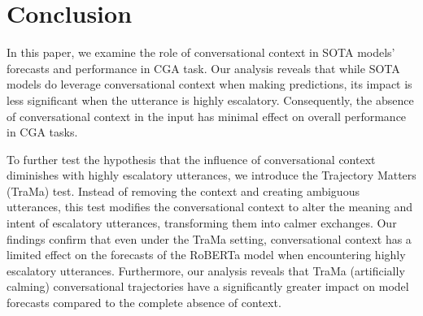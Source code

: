 \section{Conclusion}
In this paper, we examine the role of conversational context in SOTA models' forecasts and performance in CGA task. 
%
Our analysis reveals that while SOTA models do leverage conversational context when making predictions, its impact is less significant when the utterance is highly escalatory. 
%
Consequently, the absence of conversational context in the input has minimal effect on overall performance in CGA tasks.

To further test the hypothesis that the influence of conversational context diminishes with highly escalatory utterances, we introduce the Trajectory Matters (TraMa) test. 
%
Instead of removing the context and creating ambiguous utterances, this test modifies the conversational context to alter the meaning and intent of escalatory utterances, transforming them into calmer exchanges. 
%
Our findings confirm that even under the TraMa setting, conversational context has a limited effect on the forecasts of the RoBERTa model when encountering highly escalatory utterances.
%
Furthermore, our analysis reveals that TraMa (artificially calming) conversational trajectories have a significantly greater impact on model forecasts compared to the complete absence of context.

